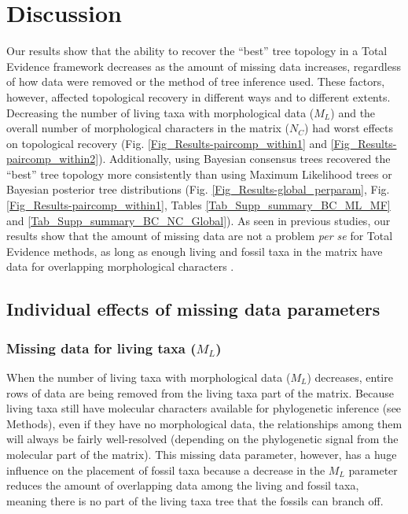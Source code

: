 %
%

\newpage
\section{Discussion}

Our results show that the ability to recover the ``best'' tree topology in a Total Evidence framework decreases as the amount of missing data increases, regardless of how data were removed or the method of tree inference used.
These factors, however, affected topological recovery in different ways and to different extents.
Decreasing the number of living taxa with morphological data ($M_{L}$) and the overall number of morphological characters in the matrix ($N_{C}$) had worst effects on topological recovery (Fig. \ref{Fig_Results-paircomp_within1} and \ref{Fig_Results-paircomp_within2}).
Additionally, using Bayesian consensus trees recovered the ``best'' tree topology more consistently than using Maximum Likelihood trees or Bayesian posterior tree distributions (Fig. \ref{Fig_Results-global_perparam}, Fig. \ref{Fig_Results-paircomp_within1}, Tables \ref{Tab_Supp_summary_BC_ML_MF} and \ref{Tab_Supp_summary_BC_NC_Global}).
As seen in previous studies, our results show that the amount of missing data are not a problem \textit{per se} for Total Evidence methods, as long as enough living and fossil taxa in the matrix have data for overlapping morphological characters \citep[e.g.][]{kearneyfragmentary2002,wiensmissing2003,rouresite-specific2011,pattinsonphylogeny2014}.

\subsection{Individual effects of missing data parameters}
\subsubsection*{Missing data for living taxa ($M_{L}$)}
When the number of living taxa with morphological data ($M_{L}$) decreases, entire rows of data are being removed from the living taxa part of the matrix.
Because living taxa still have molecular characters available for phylogenetic inference (see Methods), even if they have no morphological data, the relationships among them will always be fairly well-resolved (depending on the phylogenetic signal from the molecular part of the matrix).
This missing data parameter, however, has a huge influence on the placement of fossil taxa because a decrease in the $M_{L}$ parameter reduces the amount of overlapping data among the living and fossil taxa, meaning there is no part of the living taxa tree that the fossils can branch off.

